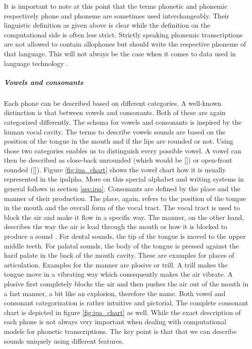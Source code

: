 It is important to note at this point that the terms phonetic and phonemic respectively phone and phoneme are sometimes used interchangeably. Their linguistic definition as given above is clear while the definition on the computational side is often less strict. Strictly speaking phonemic transcriptions are not allowed to contain allophones but should write the respective phoneme of that language. This will not always be the case when it comes to data used in language technology \citep{Lee&Ashby.2020}. 

\subparagraph{Vowels and consonants} Each phone can be described based on different categories. A well-known distinction is that between vowels and consonants. Both of these are again categorized differently. The schema for vowels and consonants is inspired by the human vocal cavity. The terms to describe vowels sounds are based on the position of the tongue in the mouth and if the lips are rounded or not. Using those two categories enables us to distinguish every possible vowel. A vowel can then be described as close-back unrounded (which would be []) or open-front rounded ([\ipa{\OE}]). Figure \ref{fig:ipa_chart} shows the vowel chart how it is usually represented in the \ac{ipalpha}. More on this special alphabet and writing systems in general follows in section \ref{sec:ipa}. Consonants are defined by the place and the manner of their production. The place, again, refers to the position of the tongue in the mouth and the overall form of the vocal tract. The vocal tract is used to block the air and make it flow in a specific way. The manner, on the other hand, describes the way the air is lead through the mouth or how it is blocked to produce a sound \citep{phonetics-video}. For dental sounds, the tip of the tongue is moved to the upper middle teeth. For palatal sounds, the body of the tongue is pressed against the hard palate in the back of the mouth cavity. These are examples for places of articulation. Examples for the manner are plosive or trill. A trill makes the tongue move in a vibrating way which consequently makes the air vibrate. A plosive first completely blocks the air and then pushes the air out of the mouth in a fast manner, a bit like an explosion, therefore the name. Both vowel and consonant categorization is rather intuitive and pictorial. The complete consonant chart is depicted in figure \ref{fig:ipa_chart} as well. While the exact description of each phone is not always very important when dealing with computational models for phonetic transcriptions. The key point is that that we can describe sounds uniquely using different features. 

